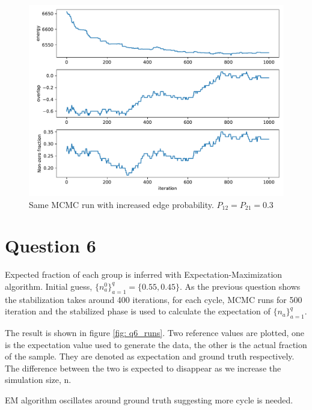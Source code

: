 \documentclass[11pt]{article}
\theoremstyle{definition}
\begin{document}
\begin{figure}[b]
    \begin{center}
    \includegraphics[width=0.8\columnwidth]{./q5_states.pdf}
    \caption{Same MCMC run with increased edge probability. $P_{12} = P_{21} = 0.3$}
    \label{fig: q5_large_pab}
    \end{center}
\end{figure}

\section*{Question 6}
Expected fraction of each group is inferred with Expectation-Maximization algorithm. Initial guess, $\{n_a^0\}_{a=1}^q = \{0.55, 0.45\}$. As the previous question shows the stabilization takes around 400 iterations, for each cycle, MCMC runs for 500 iteration and the stabilized phase is used to calculate the expectation of $\{n_a\}_{a=1}^q$.

The result is shown in figure \ref{fig: q6_runs}. Two reference values are plotted, one is the expectation value used to generate the data, the other is the actual fraction of the sample. They are denoted as expectation and ground truth respectively. The difference between the two is expected to disappear as we increase the simulation size, n.

EM algorithm oscillates around ground truth suggesting more cycle is needed.
\end{document}
